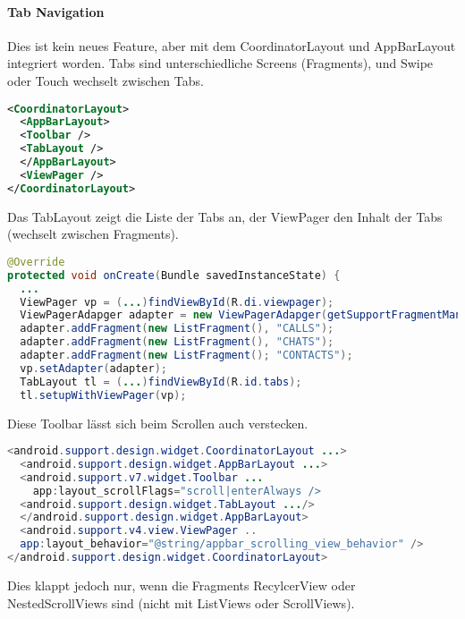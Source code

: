 \paragraph{Tab Navigation} Dies ist kein neues Feature, aber mit dem CoordinatorLayout und AppBarLayout integriert worden. Tabs sind unterschiedliche Screens (Fragments), und Swipe oder Touch wechselt zwischen Tabs.
\begin{lstlisting}[language=xml]
<CoordinatorLayout>
  <AppBarLayout>
  <Toolbar />
  <TabLayout />
  </AppBarLayout>
  <ViewPager />
</CoordinatorLayout>
\end{lstlisting}
Das TabLayout zeigt die Liste der Tabs an, der ViewPager den Inhalt der Tabs (wechselt zwischen Fragments).
\begin{lstlisting}[language=java]
@Override
protected void onCreate(Bundle savedInstanceState) {
  ...
  ViewPager vp = (...)findViewById(R.di.viewpager);
  ViewPagerAdapger adapter = new ViewPagerAdapger(getSupportFragmentManager());
  adapter.addFragment(new ListFragment(), "CALLS");
  adapter.addFragment(new ListFragment(), "CHATS");
  adapter.addFragment(new ListFragment(); "CONTACTS");
  vp.setAdapter(adapter);
  TabLayout tl = (...)findViewById(R.id.tabs);
  tl.setupWithViewPager(vp);
\end{lstlisting}
Diese Toolbar lässt sich beim Scrollen auch verstecken.
\begin{lstlisting}[language=java]
<android.support.design.widget.CoordinatorLayout ...>
  <android.support.design.widget.AppBarLayout ...>
  <android.support.v7.widget.Toolbar ...
    app:layout_scrollFlags="scroll|enterAlways />
  <android.support.design.widget.TabLayout .../>
  </android.support.design.widget.AppBarLayout>
  <android.support.v4.view.ViewPager ..
  app:layout_behavior="@string/appbar_scrolling_view_behavior" />
</android.support.design.widget.CoordinatorLayout>
\end{lstlisting}
Dies klappt jedoch nur, wenn die Fragments RecylcerView oder NestedScrollViews sind (nicht mit ListViews oder ScrollViews).
